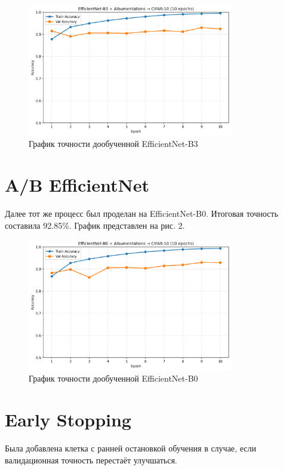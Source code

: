 \documentclass[12pt,a4paper]{article}
\begin{document}
\begin{figure}[ht]
    \centering
    \includegraphics[width=0.8\textwidth]{docs/accuracy_plot_b3.png}
    \caption{График точности дообученной EfficientNet-B3}
    \label{fig:accuracy_plot}
\end{figure}

\section{A/B EfficientNet}

Далее тот же процесс был проделан на EfficientNet-B0. Итоговая точность составила 92.85\%. График представлен на рис. 2.

\begin{figure}[ht]
    \centering
    \includegraphics[width=0.8\textwidth]{docs/accuracy_plot_b0.png}
    \caption{График точности дообученной EfficientNet-B0}
    \label{fig:accuracy_plot}
\end{figure}

\section{Early Stopping}

Была добавлена клетка с ранней остановкой обучения в случае, если валидационная точность перестаёт улучшаться.
\end{document}
